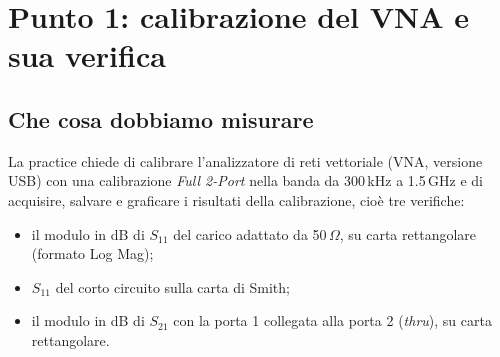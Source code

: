 \documentclass[11pt,a4paper,oneside]{book}
\begin{document}


\frontmatter
\tableofcontents

\mainmatter

\chapter[Punto 1: calibrazione]{Punto 1: calibrazione del VNA e sua verifica}

\section{Che cosa dobbiamo misurare}
La practice chiede di calibrare l'analizzatore di reti vettoriale (VNA, versione USB) con una calibrazione \emph{Full 2-Port} nella banda da 300\,kHz a 1.5\,GHz e di acquisire, salvare e graficare i risultati della calibrazione, cioè tre verifiche:
\begin{itemize}
  \item il modulo in dB di $S_{11}$ del carico adattato da 50\,$\Omega$, su carta rettangolare (formato Log Mag);
  \item $S_{11}$ del corto circuito sulla carta di Smith;
  \item il modulo in dB di $S_{21}$ con la porta 1 collegata alla porta 2 (\emph{thru}), su carta rettangolare.
\end{itemize}
\end{document}
